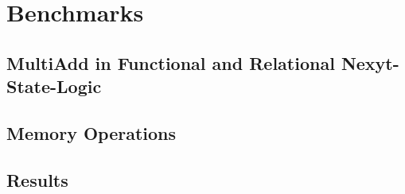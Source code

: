 \chapter{Benchmarks}\label{chap:benchmarks}
\section{MultiAdd in Functional and Relational Nexyt-State-Logic}
\section{Memory Operations}
\section{Results}